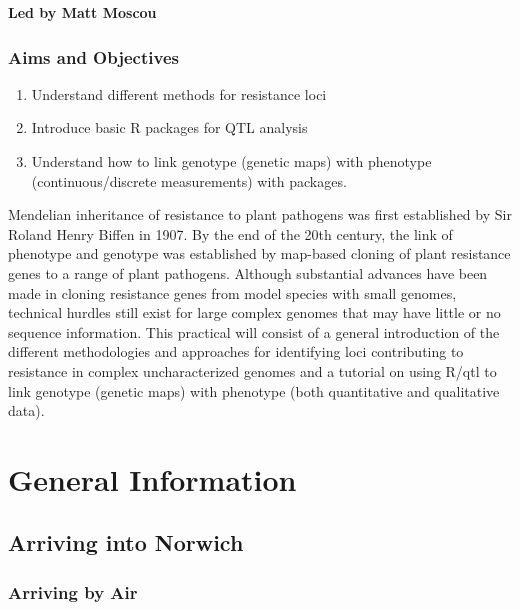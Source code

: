 \documentclass[12pt,]{book}
\providecommand{\tightlist}{%
  \setlength{\itemsep}{0pt}\setlength{\parskip}{0pt}}
\begin{document}
\textbf{Led by Matt Moscou}

\subsection*{Aims and Objectives}\label{aims-and-objectives-7}

\begin{enumerate}
\def\labelenumi{\arabic{enumi}.}
\tightlist
\item
  Understand different methods for resistance loci
\item
  Introduce basic R packages for QTL analysis
\item
  Understand how to link genotype (genetic maps) with phenotype
  (continuous/discrete measurements) with packages.
\end{enumerate}

Mendelian inheritance of resistance to plant pathogens was first
established by Sir Roland Henry Biffen in 1907. By the end of the 20th
century, the link of phenotype and genotype was established by map-based
cloning of plant resistance genes to a range of plant pathogens.
Although substantial advances have been made in cloning resistance genes
from model species with small genomes, technical hurdles still exist for
large complex genomes that may have little or no sequence information.
This practical will consist of a general introduction of the different
methodologies and approaches for identifying loci contributing to
resistance in complex uncharacterized genomes and a tutorial on using
R/qtl to link genotype (genetic maps) with phenotype (both quantitative
and qualitative data).

\chapter*{General Information}\label{general-information}

\section*{Arriving into Norwich}\label{arriving-into-norwich}

\subsection*{Arriving by Air}\label{arriving-by-air}
\end{document}
